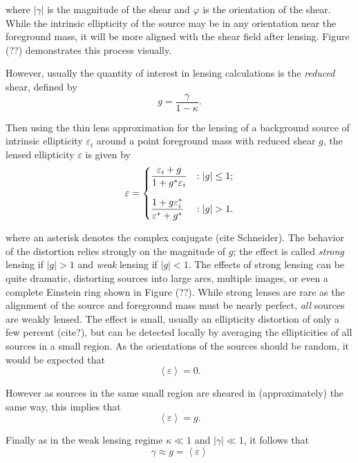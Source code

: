 \documentclass[%
 reprint,
 amsmath,amssymb,
 aps,
]{revtex4-1}
\begin{document}
\noindent where $|\gamma|$ is the magnitude of the shear and $\varphi$ is the orientation of the shear. While the intrinsic ellipticity of the source may be in any orientation near the foreground mass, it will be more aligned with the shear field after lensing. Figure (??) demonstrates this process visually.

However, usually the quantity of interest in lensing calculations is the \textit{reduced} shear, defined by
\begin{equation}
g=\frac{\gamma}{1-\kappa}.
\end{equation}

\noindent Then using the thin lens approximation for the lensing of a background source of intrinsic ellipticity $\varepsilon_i$ around a point foreground mass with reduced shear $g$, the lensed ellipticity $\varepsilon$ is given by
\begin{equation}
 \varepsilon = \begin{dcases} 
      \frac{\varepsilon_i+g}{1+g^*\varepsilon_i} & : |g|\leq1; \\[0.75em]
       \frac{1+g\varepsilon_i^*}{\varepsilon^*+g^*} & : |g|>1.
   \end{dcases}
\end{equation}

\noindent where an asterisk denotes the complex conjugate (cite Schneider). The behavior of the distortion relies strongly on the magnitude of $g$; the
effect is called \textit{strong} lensing if $|g|>1$ and \textit{weak} lensing if $|g|<1$. The effects of strong lensing can be quite dramatic, distorting sources into large arcs, multiple images, or even a complete Einstein ring shown in Figure (??). While strong lenses are rare as the alignment of the source and foreground mass must be nearly perfect, \textit{all} sources are weakly lensed. The effect is small, usually an ellipticity distortion of only a few percent (cite?), but can be detected locally by averaging the ellipticities of all sources in a small region. As the orientations of the sources should be random, it would be expected that
$$\left<\varepsilon\right>=0.$$

\noindent However as sources in the same small region are sheared in (approximately) the same way, this implies that
\begin{equation}
\left<\varepsilon\right>=g.
\end{equation}

 \noindent Finally as in the weak lensing regime ${\kappa\ll1}$ and ${|\gamma|\ll1}$, it follows that
 \begin{equation}
 \gamma\approx g=\left<\varepsilon\right>
 \end{equation}
\end{document}
